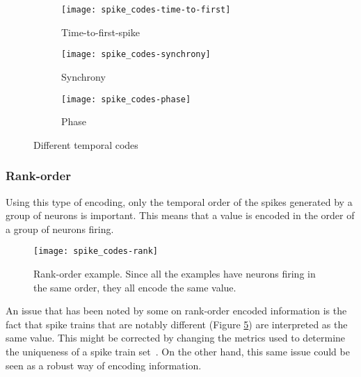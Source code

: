 \begin{figure}
  \begin{center}
  \begin{subfigure}{0.25\textwidth}
    \centering
    \captionsetup{justification=centering}
    \texttt{[image: spike\_codes-time-to-first]}
    \caption{Time-to-first-spike}
    \label{fig:neuro:time-to-first}
  \end{subfigure}
  \begin{subfigure}{0.25\textwidth}
    \centering
    \captionsetup{justification=centering}
    \texttt{[image: spike\_codes-synchrony]}
    \caption{Synchrony}
    \label{fig:neuro:synchrony}
  \end{subfigure}
  \begin{subfigure}{0.265\textwidth}
      \centering
      \captionsetup{justification=centering}
      \texttt{[image: spike\_codes-phase]}
      \caption{Phase}
      \label{fig:neuro:phase}
  \end{subfigure}
  \caption{Different temporal codes}
  \label{fig:neuro:temporal-codes}
  \end{center}
\end{figure}

\subsubsection{Rank-order}
Using this type of encoding, only the temporal order of the spikes generated by a group of neurons is important. This means that a value is encoded in the order of a group of neurons firing.

\begin{figure}[hbt]
  \begin{center}
    \texttt{[image: spike\_codes-rank]}
    \caption{Rank-order example. Since all the examples have neurons firing in the same order, they all encode the same value.}
    \label{fig:neuro:spike-rank-order}
  \end{center}
\end{figure}

An issue that has been noted by some on rank-order encoded information is the fact that spike trains that are notably different (Figure \ref{fig:neuro:spike-rank-order}) are interpreted as the same value. This might be corrected by changing the metrics used to determine the uniqueness of a spike train set~\cite{Cessac2010}. On the other hand, this same issue could be seen as a robust way of encoding information.

